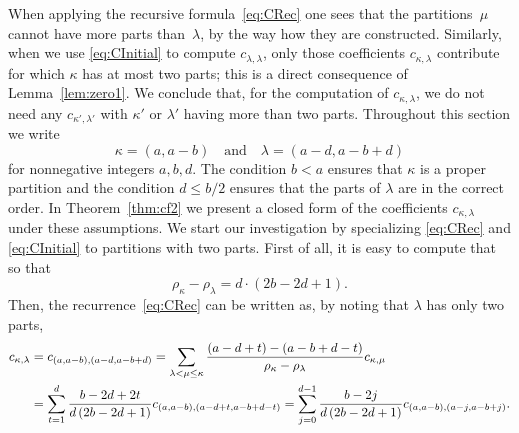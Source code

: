 \documentclass{mathincs}
\numberwithin{equation}{section}
\numberwithin{figure}{section}
\theoremstyle{plain}
\theoremstyle{definition}
\theoremstyle{remark}
\theoremstyle{plain}
\theoremstyle{definition}
\theoremstyle{plain}
\theoremstyle{plain}
\begin{document}
When applying the recursive formula~\eqref{eq:CRec} one sees that the
partitions~$\mu$ cannot have more parts than~$\lambda$, by the way how they
are constructed. Similarly, when we use \eqref{eq:CInitial} to compute
$c_{\lambda,\lambda}$, only those coefficients $c_{\kappa,\lambda}$ contribute
for which $\kappa$ has at most two parts; this is a direct consequence of
Lemma~\ref{lem:zero1}.  We conclude that, for the computation of
$c_{\kappa,\lambda}$, we do not need any $c_{\kappa',\lambda'}$ with $\kappa'$
or $\lambda'$ having more than two parts.  Throughout this section we write
\[
  \kappa=(a,a-b) \quad\text{and}\quad \lambda=(a-d,a-b+d)
\]
for nonnegative integers $a,b,d$.  The condition $b<a$ ensures that $\kappa$
is a proper partition and the condition $d\leq b/2$ ensures that the
parts of $\lambda$ are in the correct order. In Theorem~\ref{thm:cf2} we
present a closed form of the coefficients $c_{\kappa,\lambda}$ under these
assumptions. We start our investigation by specializing
 \eqref{eq:CRec} and \eqref{eq:CInitial} to partitions with two
parts. First of all, it is easy to compute that 
so that
\[
  \rho_{\kappa}-\rho_{\lambda} = d\cdot(2b-2d+1).
\]
Then, the recurrence~\eqref{eq:CRec} can be written as, by noting that
$\lambda$ has only two parts,
\begin{align}\label{eq:rec2}
  c_{\kappa,\lambda} &= c_{(a,a-b),(a-d,a-b+d)} =
  \sum_{\lambda<\mu\leq\kappa}\frac{(a-d+t)-(a-b+d-t)}{\rho_{\kappa}-\rho_{\lambda}} c_{\kappa,\mu} \\
  &= \sum_{t=1}^d\frac{b-2d+2t}{d\,(2b-2d+1)}c_{(a,a-b),(a-d+t,a-b+d-t)} 
  = \sum_{j=0}^{d-1} \frac{b-2j}{d\,(2b-2d+1)}c_{(a,a-b),(a-j,a-b+j)}. \notag
\end{align}
\end{document}
